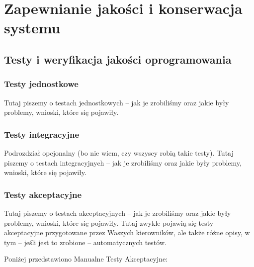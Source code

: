 \chapter{Zapewnianie jakości i konserwacja systemu}
\label{Chapter7}

\section{Testy i weryfikacja jakości oprogramowania}
\label{Chapter71}

\subsection{Testy jednostkowe}
\label{Chapter711}

Tutaj piszemy o testach jednostkowych -- jak je zrobiliśmy oraz jakie były problemy, wnioski, które się pojawiły.

\subsection{Testy integracyjne}
\label{Chapter712}

Podrozdział opcjonalny (bo nie wiem, czy wszyscy robią takie testy). Tutaj piszemy o testach integracyjnych -- jak je zrobiliśmy oraz jakie były problemy, wnioski, które się pojawiły.

\subsection{Testy akceptacyjne}
\label{Chapter713}

Tutaj piszemy o testach akceptacyjnych -- jak je zrobiliśmy oraz jakie były problemy, wnioski, które się pojawiły. Tutaj zwykle pojawią się testy akceptacyjne przygotowane przez Waszych kierowników, ale także różne opisy, w tym -- jeśli jest to zrobione -- automatycznych testów. 

Poniżej przedstawiono Manualne Testy Akceptacyjne:

\matpres
{}
\matsteps
{}

\matpres
{}
\matsteps
{}


